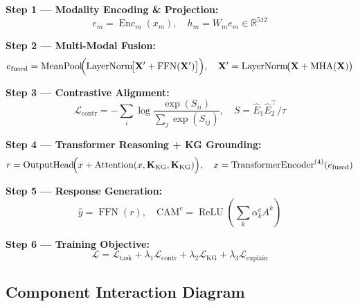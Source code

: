 \documentclass[12pt,a4paper]{article}
\newcommand{\Enc}{\operatorname{Enc}}
\newcommand{\MHA}{\operatorname{MHA}}
\newcommand{\LN}{\operatorname{LayerNorm}}
\newcommand{\FFN}{\operatorname{FFN}}
\newcommand{\ReLU}{\operatorname{ReLU}}
\newcommand{\efused}{e_{\text{fused}}}
\newcommand{\R}{\mathbb{R}}
\begin{document}
\begin{tcolorbox}[
  enhanced, breakable,
  colback=mivablue!4, colframe=mivablue,
  title={\bfseries\large MIVA-KNIGHT: Complete Mathematical Summary},
  fonttitle=\color{white},
  attach boxed title to top center={yshift=-3mm},
  boxed title style={colback=mivablue},
  arc=6pt
]
\textbf{Step 1 — Modality Encoding \& Projection:}
\[
  e_m = \Enc_m(x_m),\quad h_m = W_m e_m \in \R^{512}
\]

\textbf{Step 2 — Multi-Modal Fusion:}
\[
  \efused = \text{MeanPool}\!\Bigl(\LN\!\bigl[\mathbf{X}' + \FFN(\mathbf{X}')\bigr]\Bigr),
  \quad \mathbf{X}' = \LN\!\bigl(\mathbf{X} + \MHA(\mathbf{X})\bigr)
\]

\textbf{Step 3 — Contrastive Alignment:}
\[
  \mathcal{L}_\text{contr}
  = -\sum_i \log\frac{\exp(S_{ii})}{\sum_j \exp(S_{ij})},
  \quad S = \hat{E}_1\hat{E}_2^\top/\tau
\]

\textbf{Step 4 — Transformer Reasoning + KG Grounding:}
\[
  r = \text{OutputHead}\!\Bigl(x + \text{Attention}(x, \mathbf{K}_\text{KG},
  \mathbf{K}_\text{KG})\Bigr),\quad
  x = \text{TransformerEncoder}^{(4)}(\efused)
\]

\textbf{Step 5 — Response Generation:}
\[
  \hat{y} = \FFN(r), \quad
  \text{CAM}^c = \ReLU\!\left(\sum_k \alpha_k^c A^k\right)
\]

\textbf{Step 6 — Training Objective:}
\[
  \mathcal{L} = \mathcal{L}_\text{task}
  + \lambda_1\mathcal{L}_\text{contr}
  + \lambda_2\mathcal{L}_\text{KG}
  + \lambda_3\mathcal{L}_\text{explain}
\]
\end{tcolorbox}

\subsection{Component Interaction Diagram}
\end{document}
